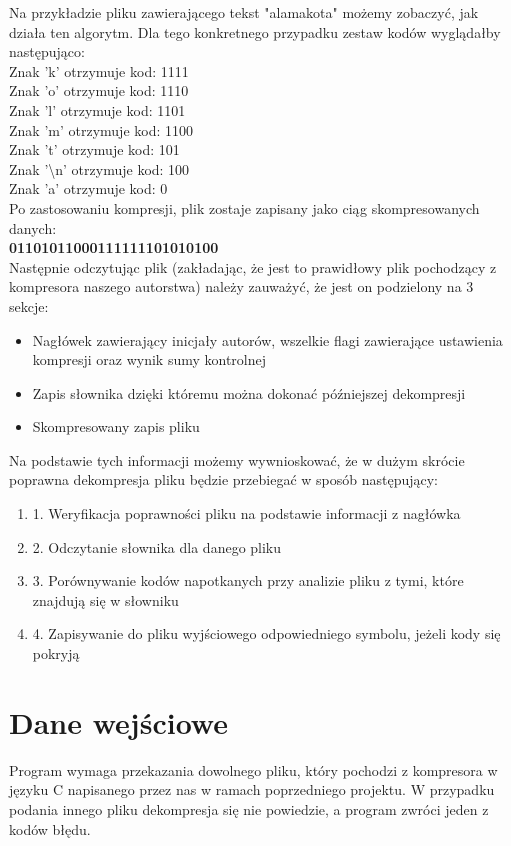\documentclass[]{article}
\begin{document}
Na przykładzie pliku zawierającego tekst "alamakota" możemy zobaczyć, jak działa ten algorytm. Dla tego konkretnego przypadku zestaw kodów wyglądałby następująco:\\
Znak 'k' otrzymuje kod: 1111\\
Znak 'o' otrzymuje kod: 1110\\
Znak 'l' otrzymuje kod: 1101\\
Znak 'm' otrzymuje kod: 1100\\
Znak 't' otrzymuje kod: 101\\
Znak '\textbackslash n' otrzymuje kod: 100\\
Znak 'a' otrzymuje kod: 0\\

Po zastosowaniu kompresji, plik zostaje zapisany jako ciąg skompresowanych danych:\\
\textbf{01101011000111111101010100}\\

Następnie odczytując plik (zakładając, że jest to prawidłowy plik pochodzący z kompresora naszego autorstwa) należy zauważyć, że jest on podzielony na 3 sekcje:
\begin{itemize}
\item
Nagłówek zawierający inicjały autorów, wszelkie flagi zawierające ustawienia kompresji oraz wynik sumy kontrolnej
\item
Zapis słownika dzięki któremu można dokonać późniejszej dekompresji
\item
Skompresowany zapis pliku
\end{itemize}
Na podstawie tych informacji możemy wywnioskować, że w dużym skrócie poprawna dekompresja pliku będzie przebiegać w sposób następujący:
\begin{enumerate}
\def\labelenumi{\arabic{enumi}.}
\item 
1. Weryfikacja poprawności pliku na podstawie informacji z nagłówka
\item
2. Odczytanie słownika dla danego pliku
\item
3. Porównywanie kodów napotkanych przy analizie pliku z tymi, które znajdują się w słowniku
\item 
4. Zapisywanie do pliku wyjściowego odpowiedniego symbolu, jeżeli kody się pokryją
\end{enumerate}
\section{Dane wejściowe}\label{header-n233}
Program wymaga przekazania dowolnego pliku, który pochodzi z kompresora w języku C napisanego przez nas w ramach poprzedniego projektu. W przypadku podania innego pliku dekompresja się nie powiedzie, a program zwróci jeden z kodów błędu.
\end{document}
